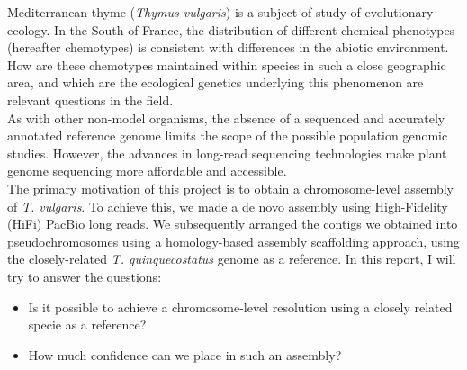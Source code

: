 Mediterranean thyme (\textit{Thymus vulgaris}) is a subject of study of evolutionary ecology. In the South of France, the distribution of different chemical phenotypes (hereafter chemotypes) is consistent with differences in the abiotic environment. How are these chemotypes maintained within species in such a close geographic area, and which are the ecological genetics underlying this phenomenon are relevant questions in the field.~\cite{bataillonGenotypePhenotypeGenetic2022}\\

As with other non-model organisms, the absence of a sequenced and accurately annotated reference genome limits the scope of the possible population genomic studies. However, the advances in long-read sequencing technologies make plant genome sequencing more affordable and accessible.~\cite{puckerPlantGenomeSequence2022} \\

The primary motivation of this project is to obtain a chromosome-level assembly of \textit{T. vulgaris}. To achieve this, we made a de novo assembly using High-Fidelity (HiFi) PacBio long reads. We subsequently arranged the contigs we obtained into pseudochromosomes using a homology-based assembly scaffolding approach, using the closely-related \textit{T. quinquecostatus} genome as a reference. In this report, I will try to answer the questions:

\begin{itemize}
    \item Is it possible to achieve a chromosome-level resolution using a closely related specie as a reference?
    \item How much confidence can we place in such an assembly?
\end{itemize}

